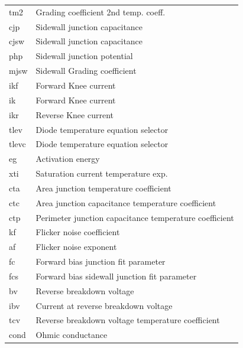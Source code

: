 \begin{longtable}{l l}
																					{\small tm2} & {\small Grading coefficient 2nd temp. coeff.} \\
																					{\small cjp} & {\small Sidewall junction capacitance} \\
																					{\small cjsw} & {\small Sidewall junction capacitance} \\
																					{\small php} & {\small Sidewall junction potential} \\
																					{\small mjsw} & {\small Sidewall Grading coefficient} \\
																					{\small ikf} & {\small Forward Knee current} \\
																					{\small ik} & {\small Forward Knee current} \\
																					{\small ikr} & {\small Reverse Knee current} \\
																					{\small tlev} & {\small Diode temperature equation selector} \\
																					{\small tlevc} & {\small Diode temperature equation selector} \\
																					{\small eg} & {\small Activation energy} \\
																					{\small xti} & {\small Saturation current temperature exp.} \\
																					{\small cta} & {\small Area junction temperature coefficient} \\
																					{\small ctc} & {\small Area junction capacitance temperature coefficient} \\
																					{\small ctp} & {\small Perimeter junction capacitance temperature coefficient} \\
																					{\small kf} & {\small Flicker noise coefficient} \\
																					{\small af} & {\small Flicker noise exponent} \\
																					{\small fc} & {\small Forward bias junction fit parameter} \\
																					{\small fcs} & {\small Forward bias sidewall junction fit parameter} \\
																					{\small bv} & {\small Reverse breakdown voltage} \\
																					{\small ibv} & {\small Current at reverse breakdown voltage} \\
																					{\small tcv} & {\small Reverse breakdown voltage temperature coefficient} \\
																					{\small cond} & {\small Ohmic conductance} 
\end{longtable}																				


